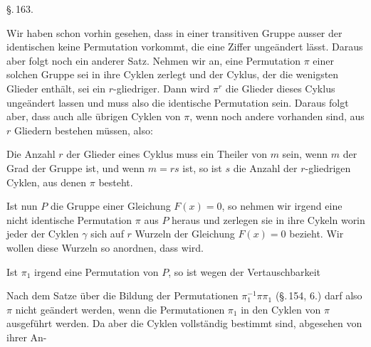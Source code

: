 \begin{center}
\S.\,163.

\end{center}

Wir haben schon vorhin gesehen, dass in einer transitiven  Gruppe ausser der identischen keine Permutation vorkommt, die eine Ziffer ungeändert lässt. Daraus aber folgt noch ein anderer Satz. Nehmen wir an, eine Permutation $\pi$ einer solchen Gruppe sei in ihre Cyklen zerlegt und der Cyklus, der die wenigsten Glieder enthält, sei ein $r$-gliedriger. Dann wird $\pi^r$ die Glieder dieses Cyklus ungeändert lassen und muss also die identische Permutation sein. Daraus folgt aber, dass auch alle übrigen Cyklen von $\pi$, wenn noch andere vorhanden sind, aus $r$ Gliedern bestehen müssen, also:


Die Anzahl $r$ der Glieder eines Cyklus muss ein Theiler von $m$ sein, wenn $m$ der Grad der Gruppe ist, und wenn $m=rs$ ist, so ist $s$ die Anzahl der $r$-gliedrigen Cyklen, aus denen $\pi$ besteht.

Ist nun $P$ die Gruppe einer  Gleichung $F(x)=0$, so nehmen wir irgend eine nicht identische Permutation $\pi$ aus $P$ heraus und zerlegen sie in ihre Cykeln
worin jeder der Cyklen $\gamma$ sich auf $r$ Wurzeln der Gleichung $F(x)=0$ bezieht. Wir wollen diese Wurzeln so anordnen, dass
wird.

Ist $\pi_1$ irgend eine Permutation von $P$, so ist wegen der Vertauschbarkeit

Nach dem Satze über die Bildung der Permutationen $\pi_1^{-1}\pi\pi_1$ (\S.\,154, 6.) darf also $\pi$ nicht geändert werden, wenn die Permutationen $\pi_1$ in den Cyklen von $\pi$ ausgeführt werden. Da aber die Cyklen vollständig bestimmt sind, abgesehen von ihrer An-
